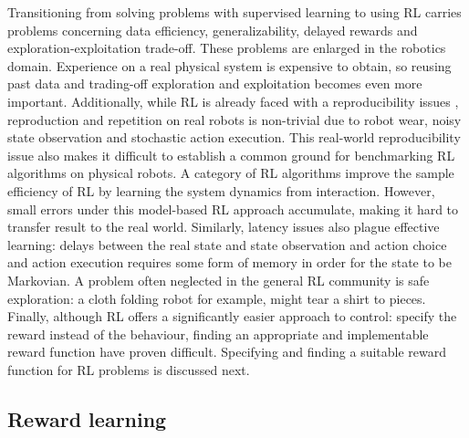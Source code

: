 \documentclass[\home/main.tex]{subfiles}
\begin{document}
Transitioning from solving problems with supervised learning to using RL carries problems concerning data efficiency, generalizability, delayed rewards and exploration-exploitation trade-off. These problems are enlarged in the robotics domain.
Experience on a real physical system is expensive to obtain, so reusing past data and trading-off exploration and exploitation becomes even more important.
Additionally, while RL is already faced with a reproducibility issues \autocite{henderson2018deep}, reproduction and repetition on real robots is non-trivial due to robot wear, noisy state observation and stochastic action execution. This real-world reproducibility issue also makes it difficult to establish a common ground for benchmarking RL algorithms on physical robots.
A category of RL algorithms improve the sample efficiency of RL by learning the system dynamics from interaction. However, small errors under this model-based RL approach accumulate, making it hard to transfer result to the real world.
Similarly, latency issues also plague effective learning: delays between the real state and state observation and action choice and action execution requires some form of memory in order for the state to be Markovian.
A problem often neglected in the general RL community is safe exploration: a cloth folding robot for example, might tear a shirt to pieces.
Finally, although RL offers a significantly easier approach to control: specify the reward instead of the behaviour, finding an appropriate and implementable reward function have proven difficult. Specifying and finding a suitable reward function for RL problems is discussed next.

\subsection{Reward learning}  \label{subsec:lit_reward_learning}
\end{document}
